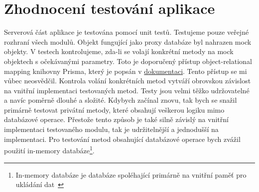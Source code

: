 \chapter{Zhodnocení testování aplikace}\label{ch:zhodnoceni-testovani-aplikace}

Serverová část aplikace je testována pomocí unit testů.
Testujeme pouze veřejné rozhraní všech modulů.
Objekt fungující jako proxy databáze byl nahrazen mock objekty.
V testech kontrolujeme, zda-li se volají konkrétní metody na mock objektech s očekávanými parametry.
Toto je doporučený přístup object-relational mapping knihovny Prisma, který je popsán v \href{https://www.prisma.io/docs/guides/testing/unit-testing}{dokumentaci}.
Tento přístup se mi vůbec neosvědčil.
Kontrola volání konkrétních metod vytváří obrovskou závislost na vnitřní implementaci testovaných metod.
Testy jsou velmi těžko udržovatelné a navíc poměrně dlouhé a složité.
Kdybych začínal znovu, tak bych se snažil primárně testovat privátní metody, které obsahují veškerou logiku mimo databázové operace.
Přestože tento způsob je také silně závislý na vnitřní implementaci testovaného modulu, tak je udržitelnější a jednodušší na implementaci.
Pro testování metod obsahující databázové operace bych zvážil použití in-memory databáze\footnote{In-memory databáze je databáze spoléhající primárně na vnitřní paměť pro ukládání dat~\cite{in-memory-db-definition}}.
